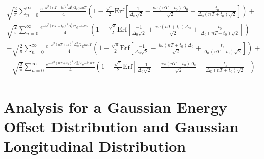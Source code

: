 \begin{gather}
\sqrt{\frac{2}{\pi}}\sum^{\infty}_{n=0}\frac{e^{-\omega^2(nT+t_0)^2\Delta^2_0/2}e^{i\omega nT}}{4}\left(1-\frac{\sqrt{\pi}}{2}\text{Erf}\left[\frac{-1}{\Delta_0\sqrt{2}}-\frac{i\omega (nT+t_0)\Delta_0}{\sqrt{2}}+\frac{t_0}{\Delta_0(nT+t_0)\sqrt{2}}\right]\right)+ \nonumber \\
\sqrt{\frac{2}{\pi}}\sum^{\infty}_{n=0}\frac{e^{-\omega^2(nT+t_0)^2\Delta^2_0/2}e^{-i\omega nT}}{4}\left(1-\frac{\sqrt{\pi}}{2}\text{Erf}\left[\frac{-1}{\Delta_0\sqrt{2}}+\frac{i\omega (nT+t_0)\Delta_0}{\sqrt{2}}+\frac{t_0}{\Delta_0(nT+t_0)\sqrt{2}}\right]\right) \nonumber \\
-\sqrt{\frac{2}{\pi}}\sum^{\infty}_{n=0}\frac{e^{-\omega^2(nT+t_0)^2\Delta^2_0/2}e^{i\omega nT}}{4}\left(1-\frac{\sqrt{\pi}}{2}\text{Erf}\left[\frac{-1}{\Delta_0\sqrt{2}}-\frac{i\omega (nT+t_0)\Delta_0}{\sqrt{2}}+\frac{t_s}{\Delta_0(nT+t_0)\sqrt{2}}\right]\right)+ \nonumber \\
-\sqrt{\frac{2}{\pi}}\sum^{\infty}_{n=0}\frac{e^{-\omega^2(nT+t_0)^2\Delta^2_0/2}e^{-i\omega nT}}{4}\left(1-\frac{\sqrt{\pi}}{2}\text{Erf}\left[\frac{-1}{\Delta_0\sqrt{2}}+\frac{i\omega (nT+t_0)\Delta_0}{\sqrt{2}}+\frac{t_s}{\Delta_0(nT+t_0)\sqrt{2}}\right]\right)
\end{gather}

\section{Analysis for a Gaussian Energy Offset Distribution and Gaussian Longitudinal Distribution}
